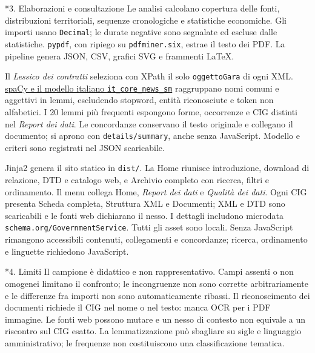 \documentclass[10pt,a4paper]{article}
\makeatletter
\newcommand{\code}[1]{\texttt{#1}}
\renewcommand\section{\@startsection{section}{1}{0pt}{8pt}{4pt}{\large\bfseries}}
\makeatother
\begin{document}
\section*{3. Elaborazioni e consultazione}
Le analisi calcolano copertura delle fonti, distribuzioni territoriali, sequenze cronologiche e statistiche economiche. Gli importi usano \code{Decimal}; le durate negative sono segnalate ed escluse dalle statistiche. \code{pypdf}, con ripiego su \code{pdfminer.six}, estrae il testo dei PDF. La pipeline genera JSON, CSV, grafici SVG e frammenti LaTeX.

Il \emph{Lessico dei contratti} seleziona con XPath il solo \code{oggettoGara} di ogni XML. \href{https://spacy.io/models/it}{spaCy e il modello italiano \code{it\_core\_news\_sm}} raggruppano nomi comuni e aggettivi in lemmi, escludendo stopword, entità riconosciute e token non alfabetici. I 20 lemmi più frequenti espongono forme, occorrenze e CIG distinti nel \emph{Report dei dati}. Le concordanze conservano il testo originale e collegano il documento; si aprono con \code{details/summary}, anche senza JavaScript. Modello e criteri sono registrati nel JSON scaricabile.

Jinja2 genera il sito statico in \code{dist/}. La Home riunisce introduzione, download di relazione, DTD e catalogo web, e Archivio completo con ricerca, filtri e ordinamento. Il menu collega Home, \emph{Report dei dati} e \emph{Qualità dei dati}. Ogni CIG presenta Scheda completa, Struttura XML e Documenti; XML e DTD sono scaricabili e le fonti web dichiarano il nesso. I dettagli includono microdata \code{schema.org/GovernmentService}. Tutti gli asset sono locali. Senza JavaScript rimangono accessibili contenuti, collegamenti e concordanze; ricerca, ordinamento e linguette richiedono JavaScript.

\section*{4. Limiti}
Il campione è didattico e non rappresentativo. Campi assenti o non omogenei limitano il confronto; le incongruenze non sono corrette arbitrariamente e le differenze fra importi non sono automaticamente ribassi. Il riconoscimento dei documenti richiede il CIG nel nome o nel testo: manca OCR per i PDF immagine. Le fonti web possono mutare e un nesso di contesto non equivale a un riscontro sul CIG esatto. La lemmatizzazione può sbagliare su sigle e linguaggio amministrativo; le frequenze non costituiscono una classificazione tematica.
\end{document}
